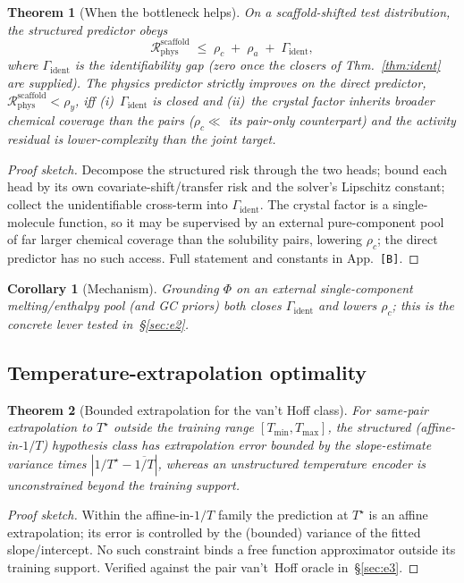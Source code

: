 \documentclass[11pt]{article}
\newtheorem{theorem}{Theorem}
\newtheorem{corollary}{Corollary}
\newcommand{\pending}[1][?]{{\color{red}\texttt{[#1]}}}
\newcommand{\Phicry}{\Phi}
\begin{document}
\begin{theorem}[When the bottleneck helps]\label{thm:cond-opt}
On a scaffold-shifted test distribution, the structured predictor obeys
\begin{equation}
  \mathcal R_{\mathrm{phys}}^{\mathrm{scaffold}} \;\le\;
  \rho_c \;+\; \rho_a \;+\; \Gamma_{\mathrm{ident}},
\end{equation}
where $\Gamma_{\mathrm{ident}}$ is the identifiability gap (zero once the closers
of Thm.~\ref{thm:ident} are supplied). The physics predictor strictly improves
on the direct predictor, $\mathcal R_{\mathrm{phys}}^{\mathrm{scaffold}}<\rho_y$,
\emph{iff} (i)~$\Gamma_{\mathrm{ident}}$ is closed and (ii)~the crystal factor
inherits broader chemical coverage than the pairs ($\rho_c\ll$ its pair-only
counterpart) and the activity residual is lower-complexity than the joint target.
\end{theorem}
\begin{proof}[Proof sketch]
Decompose the structured risk through the two heads; bound each head by its own
covariate-shift/transfer risk and the solver's Lipschitz constant; collect the
unidentifiable cross-term into $\Gamma_{\mathrm{ident}}$. The crystal factor is a
single-molecule function, so it may be supervised by an external pure-component
pool of far larger chemical coverage than the solubility pairs, lowering $\rho_c$;
the direct predictor has no such access. Full statement and constants in
App.~\pending[B].
\end{proof}

\begin{corollary}[Mechanism]
Grounding $\Phicry$ on an external single-component melting/enthalpy pool (and GC
priors) both closes $\Gamma_{\mathrm{ident}}$ and lowers $\rho_c$; this is the
concrete lever tested in~\S\ref{sec:e2}.
\end{corollary}

\subsection{Temperature-extrapolation optimality}
\begin{theorem}[Bounded extrapolation for the van't Hoff class]\label{thm:temp}
For same-pair extrapolation to $T^\star$ outside the training range
$[T_{\min},T_{\max}]$, the structured (affine-in-$1/T$) hypothesis class has
extrapolation error bounded by the slope-estimate variance times
$|1/T^\star-\overline{1/T}|$, whereas an unstructured temperature encoder is
unconstrained beyond the training support.
\end{theorem}
\begin{proof}[Proof sketch]
Within the affine-in-$1/T$ family the prediction at $T^\star$ is an affine
extrapolation; its error is controlled by the (bounded) variance of the fitted
slope/intercept. No such constraint binds a free function approximator outside
its training support. Verified against the pair van't~Hoff oracle in~\S\ref{sec:e3}.
\end{proof}
\end{document}
